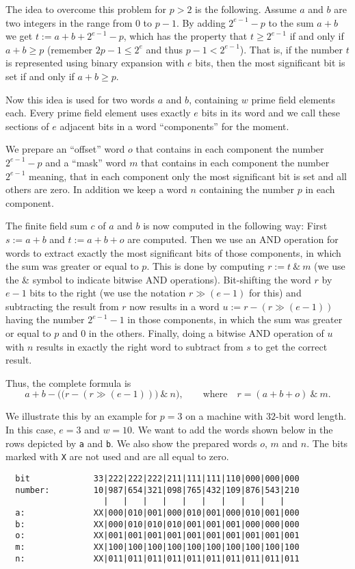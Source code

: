 The idea to overcome this problem for $p > 2$ is the following. 
Assume $a$ and $b$
are two integers in the range from $0$ to $p-1$. By adding
$2^{e-1}-p$ to the sum $a+b$ we get $t := a+b+2^{e-1}-p$, which
has the property that $t \ge 2^{e-1}$ if and only if $a+b \ge p$
(remember $2p-1 \le 2^e$ and thus $p-1 < 2^{e-1}$). That is, if
the number $t$ is represented using binary expansion with $e$ bits,
then the most significant bit is set if and only if $a+b \ge p$.

Now this idea is used for two words $a$ and $b$, containing $w$
prime field elements each. Every prime field element uses exactly $e$ bits
in its word and we call these sections of $e$ adjacent bits in a word 
``components'' for the moment. 

We prepare an ``offset'' word $o$ that contains in each component the
number $2^{e-1}-p$ and a ``mask'' word $m$ that contains in each component
the number $2^{e-1}$ meaning, that in each component only the most significant
bit is set and all others are zero. In addition we keep a word $n$
containing the number $p$ in each component.

The finite field sum $c$ of $a$ and $b$ is now computed in the following way:
First $s := a+b$ and $t := a+b+o$ are computed. Then we use an AND 
operation for words to extract exactly the most significant bits of
those components, in which the sum was greater or equal to $p$.
This is done by computing $r := t \ \&\  m$ (we use the \& symbol to
indicate bitwise AND operations). Bit-shifting
the word $r$ by $e-1$ bits to the right (we use the notation
$r \gg (e-1)$ for this) and subtracting the
result from $r$ now results in a word $u := r - (r \gg (e-1))$
having the number $2^{e-1}-1$
in those components, in which the sum was greater or equal to $p$ and
$0$ in the others. Finally, doing a bitwise AND operation of $u$ with
$n$ results in exactly the right word to subtract from $s$ to get
the correct result.

Thus, the complete formula is
\[ a+b - \Big(\big(r - (r \gg (e-1))\big) \ \&\ n \Big),
   \qquad \mbox{where}\quad r = (a+b+o) \ \&\  m . \]

We illustrate this by an example for $p=3$ on a machine with
$32$-bit word length. In this case, $e = 3$ and $w = 10$. We want to
add the words shown below in the rows depicted by \texttt{a} and \texttt{b}.
We also show the prepared words $o$, $m$ and $n$. The bits marked
with \texttt{X} are not used and are all equal to zero.

\begin{verbatim}
  bit             33|222|222|222|211|111|111|110|000|000|000
  number:         10|987|654|321|098|765|432|109|876|543|210
                    |   |   |   |   |   |   |   |   |   |
  a:              XX|000|010|001|000|010|001|000|010|001|000
  b:              XX|000|010|010|010|001|001|001|000|000|000
  o:              XX|001|001|001|001|001|001|001|001|001|001
  m:              XX|100|100|100|100|100|100|100|100|100|100
  n:              XX|011|011|011|011|011|011|011|011|011|011
\end{verbatim}


